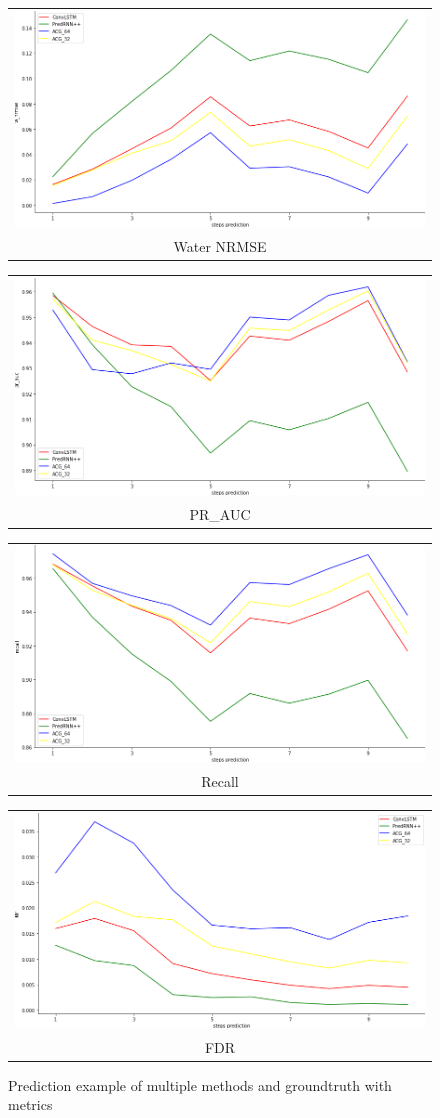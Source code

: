 \begin{figure}
\begin{center}
        \begin{tabular}[b]{c}
            \includegraphics[width=.4\linewidth]{figures/chap4/10/30/w_nrmse.png} \\
            \small Water NRMSE
          \end{tabular}
          \begin{tabular}[b]{c}
            \includegraphics[width=.4\linewidth]{figures/chap4/10/30/pr_auc.png} \\
            \small PR\_AUC
          \end{tabular}
          \begin{tabular}[b]{c}
              \includegraphics[width=.4\linewidth]{figures/chap4/10/30/recall.png} \\
              \small Recall
          \end{tabular} 
          \begin{tabular}[b]{c}
              \includegraphics[width=.4\linewidth]{figures/chap4/10/30/fdr.png} \\
              \small FDR
          \end{tabular}
    \end{center}
    \caption[]{Prediction example of multiple methods and groundtruth with metrics}
    \label{fig:chap4-test-30}
\end{figure}


